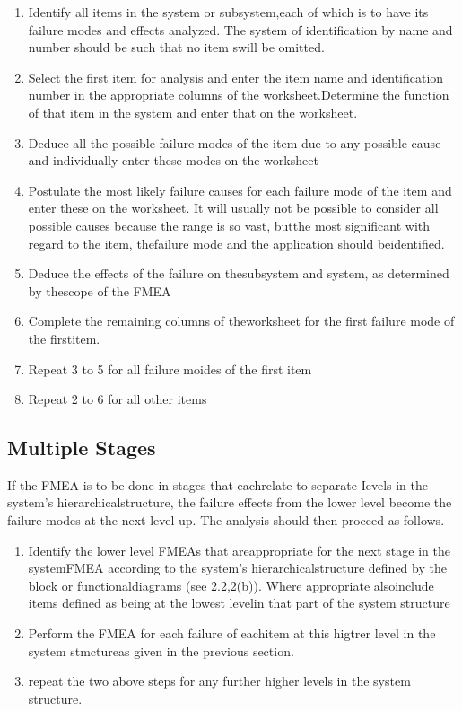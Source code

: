 \documentclass[./dissertation.tex]{subfiles}
\begin{document}
\begin{enumerate}

	\item Identify all items in the system or subsystem,each of which is to have its failure modes and effects analyzed. The system of identification by name and number should be such that no item swill be omitted.
	\item Select the first item for analysis and enter the item name and identification number in the appropriate columns of the worksheet.Determine the function of that item in the system and enter that on the worksheet.
	\item Deduce all the possible failure modes of the item due to any possible cause and individually enter these modes on the worksheet
	\item  Postulate the most likely failure causes for each failure mode of the item and enter these on the worksheet. It will usually not be possible to consider all possible causes because the range is so vast, butthe most significant with regard to the item, thefailure mode and the application should beidentified.
	\item Deduce the effects of the failure on thesubsystem and system, as determined by thescope of the FMEA
	\item  Complete the remaining columns of theworksheet for the first failure mode of the firstitem.
	\item Repeat 3 to 5 for all failure moides of the first item
	\item Repeat 2 to 6 for all other items
\end{enumerate}


\subsection{Multiple Stages}
If the FMEA is to be done in stages that eachrelate to separate Ievels in the system's hierarchicalstructure, the failure effects from the lower level become the failure modes at the next level up. The analysis should then proceed as follows.

\begin{enumerate}
	\item Identify the lower level FMEAs that areappropriate for the next stage in the systemFMEA according to the system's hierarchicalstructure defined by the block or functionaldiagrams (see 2.2,2(b)). Where appropriate alsoinclude items defined as being at the lowest levelin that part of the system structure
	\item Perform the FMEA for each failure of eachitem at this higtrer level in the system stmctureas given in the previous section.
	\item repeat the two above steps for any further higher levels in the system structure.
\end{enumerate}
\end{document}
